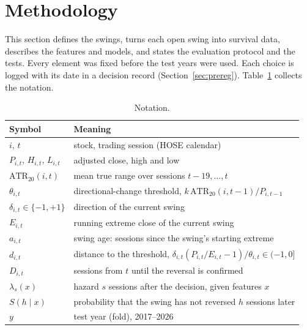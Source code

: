 \section{Methodology}\label{sec:method}

This section defines the swings, turns each open swing into survival data, describes the
features and models, and states the evaluation protocol and the tests. Every element was fixed
before the test years were used. Each choice is logged with its date in a decision record
(Section~\ref{sec:prereg}). Table~\ref{tab:notation} collects the notation.

\begin{table}[!htbp]
\centering
\caption{Notation.}\label{tab:notation}
\small
\begin{tabular}{ll}
\toprule
Symbol & Meaning \\
\midrule
$i$, $t$ & stock, trading session (HOSE calendar) \\
$P_{i,t}$, $H_{i,t}$, $L_{i,t}$ & adjusted close, high and low \\
$\mathrm{ATR}_{20}(i,t)$ & mean true range over sessions $t-19,\dots,t$ \\
$\theta_{i,t}$ & directional-change threshold, $k\,\mathrm{ATR}_{20}(i,t-1)/P_{i,t-1}$ \\
$\delta_{i,t}\in\{-1,+1\}$ & direction of the current swing \\
$E_{i,t}$ & running extreme close of the current swing \\
$a_{i,t}$ & swing age: sessions since the swing's starting extreme \\
$d_{i,t}$ & distance to the threshold, $\delta_{i,t}(P_{i,t}/E_{i,t}-1)/\theta_{i,t}\in(-1,0]$ \\
$D_{i,t}$ & sessions from $t$ until the reversal is confirmed \\
$\lambda_s(x)$ & hazard $s$ sessions after the decision, given features $x$ \\
$S(h\mid x)$ & probability that the swing has not reversed $h$ sessions later \\
$y$ & test year (fold), 2017--2026 \\
\bottomrule
\end{tabular}
\end{table}

